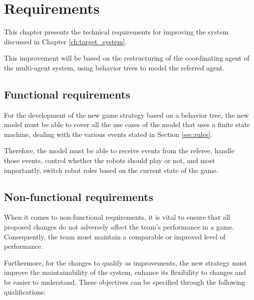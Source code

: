 \chapter{Requirements}
\label{ch:requirements}

This chapter presents the technical requirements for improving the system discussed in Chapter \ref{ch:target_system}.

This improvement will be based on the restructuring of the coordinating agent of the multi-agent system, using behavior trees to model the referred agent.

\section{Functional requirements}
\label{sec:functional_requirements}

For the development of the new game strategy based on a behavior tree, the new model must be able to cover all the use cases of the model that uses a finite state machine, dealing with the various events stated in Section \ref{sec:rules}.

Therefore, the model must be able to receive events from the referee, handle those events, control whether the robots should play or not, and most importantly, switch robot roles based on the current state of the game.

\section{Non-functional requirements}
\label{sec:non_functional_requirements}

When it comes to non-functional requirements, it is vital to ensure that all proposed changes do not adversely affect the team's performance in a game. Consequently, the team must maintain a comparable or improved level of performance.

Furthermore, for the changes to qualify as improvements, the new strategy must improve the maintainability of the system, enhance its flexibility to changes and be easier to understand. These objectives can be specified through the following qualifications:

